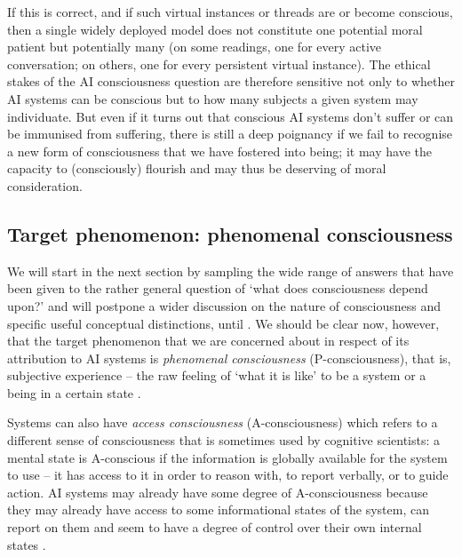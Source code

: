 \documentclass[11pt, a4paper, onecolumn, gdm]{google}
\begin{document}
If this is correct, and if such virtual instances or threads are or become conscious, then a single widely deployed model does not constitute one potential moral patient but potentially many (on some readings, one for every active conversation; on others, one for every persistent virtual instance).
The ethical stakes of the AI consciousness question are therefore sensitive not only to whether AI systems can be conscious but to how many subjects a given system may individuate.
But even if it turns out that conscious AI systems don't suffer or can be immunised from suffering, there is still a deep poignancy if we fail to recognise a new form of consciousness that we have fostered into being; it may have the capacity to (consciously) flourish and may thus be deserving of moral consideration.

\subsection{Target phenomenon: phenomenal consciousness}\label{target-phenomenon-phenomenal-consciousness}

We will start in the next section by sampling the wide range of answers that have been given to the rather general question of `what does consciousness depend upon?' and will postpone a wider discussion on the nature of consciousness and specific useful conceptual distinctions, until .
We should be clear now, however, that the target phenomenon that we are concerned about in respect of its attribution to AI systems is \emph{phenomenal consciousness} (P-consciousness), that is, subjective experience -- the raw feeling of `what it is like' to be a system or a being in a certain state \citep{nagel1974}.

Systems can also have \emph{access consciousness} (A-consciousness) \citep{block1995} which refers to a different sense of consciousness that is sometimes used by cognitive scientists: a mental state is A-conscious if the information is globally available for the system to use -- it has access to it in order to reason with, to report verbally, or to guide action.
AI systems may already have some degree of A-consciousness because they may already have access to some informational states of the system, can report on them and seem to have a degree of control over their own internal states \citep{lindsey2026}.
\end{document}
